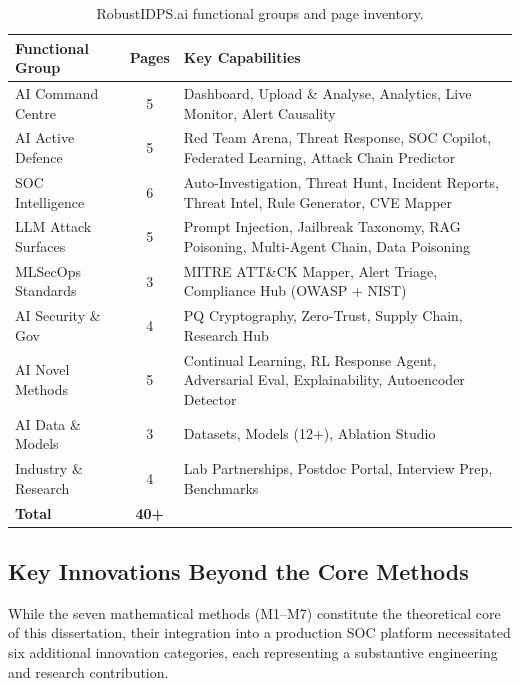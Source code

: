 \documentclass[12pt,a4paper]{article}
\begin{document}
\begin{table}[htbp]
\centering
\caption{RobustIDPS.ai functional groups and page inventory.}
\label{tab:functional-groups}
\small
\begin{tabularx}{\textwidth}{l c X}
\toprule
\textbf{Functional Group} & \textbf{Pages} & \textbf{Key Capabilities} \\
\midrule
AI Command Centre      & 5 & Dashboard, Upload \& Analyse, Analytics, Live Monitor, Alert Causality \\
AI Active Defence      & 5 & Red Team Arena, Threat Response, SOC Copilot, Federated Learning, Attack Chain Predictor \\
SOC Intelligence       & 6 & Auto-Investigation, Threat Hunt, Incident Reports, Threat Intel, Rule Generator, CVE Mapper \\
LLM Attack Surfaces    & 5 & Prompt Injection, Jailbreak Taxonomy, RAG Poisoning, Multi-Agent Chain, Data Poisoning \\
MLSecOps Standards     & 3 & MITRE ATT\&CK Mapper, Alert Triage, Compliance Hub (OWASP + NIST) \\
AI Security \& Gov     & 4 & PQ Cryptography, Zero-Trust, Supply Chain, Research Hub \\
AI Novel Methods       & 5 & Continual Learning, RL Response Agent, Adversarial Eval, Explainability, Autoencoder Detector \\
AI Data \& Models      & 3 & Datasets, Models (12+), Ablation Studio \\
Industry \& Research   & 4 & Lab Partnerships, Postdoc Portal, Interview Prep, Benchmarks \\
\midrule
\textbf{Total}         & \textbf{40+} & \\
\bottomrule
\end{tabularx}
\end{table}

\subsection{Key Innovations Beyond the Core Methods}
\label{subsec:key-innovations}

While the seven mathematical methods (M1--M7) constitute the
theoretical core of this dissertation, their integration into a
production SOC platform necessitated six additional innovation
categories, each representing a substantive engineering and research
contribution.
\end{document}
